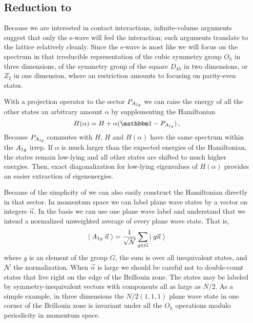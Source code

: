 \subsection{Reduction to \Aoneg}

Because we are interested in contact interactions, infinite-volume arguments suggest that only the s-wave will feel the interaction; such arguments translate to the lattice relatively cleanly.
Since the s-wave is most like \Aoneg we will focus on the spectrum in that irreducible representation of the cubic symmetry group $O_h$ in three dimensions, of the symmetry group of the square $D_{4h}$ in two dimensions, or $Z_2$ in one dimension, where an \Aoneg restriction amounts to focusing on parity-even states.

With a projection operator to the \Aoneg sector $P_{A_{1g}}$ we can raise the energy of all the other states an arbitrary amount $\alpha$ by supplementing the Hamiltonian
\begin{equation}
    H(\alpha) = H + \alpha (\one - P_{\Aoneg}) \, ,
\end{equation}
Because $P_{A_{1g}}$ commutes with $H$, $H$ and $H(\alpha)$ have the same spectrum within the $A_{1g}$ irrep.
If $\alpha$ is much larger than the expected energies of the Hamiltonian, the \Aoneg states remain low-lying and all other states are shifted to much higher energies.
Then, exact diagonalization for low-lying eigenvalues of $H(\alpha)$ provides an easier extraction of \Aoneg eigenenergies.

Because of the simplicity of \Aoneg we can also easily construct the Hamiltonian directly in that sector.
In momentum space we can label plane wave states by a vector on integers $\vec{n}$.
In the \Aoneg basis we can use one plane wave label and understand that we intend a normalized unweighted average of every plane wave state.
That is,
\begin{equation}
    \left|\;A_{1g}\; \vec{n}\;\right\rangle = \frac{1}{\sqrt{\mathcal{N}}} \sum_{g \in G} \left|\; g\vec{n}\;\right\rangle
\end{equation}
where $g$ is an element of the group $G$, the sum is over all inequivalent states, and $\mathcal{N}$ the normalization.
When $\vec{n}$ is large we should be careful not to double-count states that live right on the edge of the Brillouin zone.
The states may be labeled by symmetry-inequivalent vectors with components all as large as $N/2$.
As a simple example, in three dimensions the $N/2(1,1,1)$ plane wave state in one corner of the Brillouin zone is invariant under all the $O_h$ operations modulo periodicity in momentum space.

